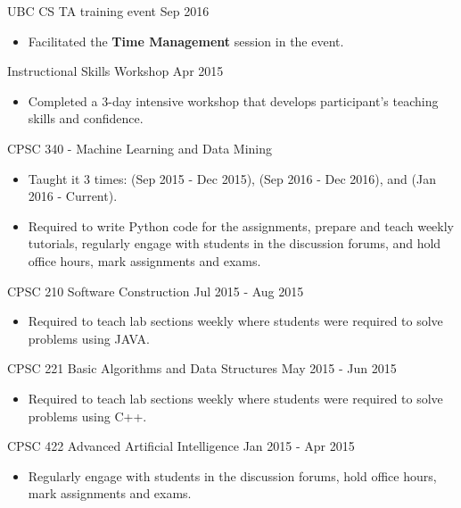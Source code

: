 \documentclass[10pt]{article}
\newenvironment{innerlist}[1][\enskip\textbullet]%
        {\begin{itemize}[#1,leftmargin=*,parsep=0pt,itemsep=0pt,topsep=0pt,partopsep=0pt]}
        {\end{itemize}}
\begin{document}
UBC CS TA training event \hfill Sep 2016
\begin{innerlist}
    \item Facilitated the {\bf Time Management} session in the event.\\
\end{innerlist}

Instructional Skills Workshop \hfill Apr 2015
\begin{innerlist}
    \item Completed a 3-day intensive workshop that develops participant's teaching skills and confidence.\\
\end{innerlist}


CPSC 340 - Machine Learning and Data Mining
\begin{innerlist}
    \item Taught it 3 times: (Sep 2015 - Dec 2015), (Sep 2016 - Dec 2016), and (Jan 2016 - Current).
    \item Required to write Python code for the assignments, prepare and teach weekly tutorials, regularly engage with students in the discussion forums, and hold office hours, mark assignments and exams.\\
\end{innerlist}

CPSC 210 Software Construction \hfill Jul 2015 - Aug 2015
\begin{innerlist}
    \item Required to teach lab sections weekly where students were required to solve problems using JAVA.\\
\end{innerlist}

CPSC 221 Basic Algorithms and Data Structures  \hfill May 2015 - Jun 2015
\begin{innerlist}
   \item Required to teach lab sections weekly where students were required to solve problems using C++.\\
\end{innerlist}

CPSC 422 Advanced Artificial Intelligence \hfill Jan 2015 - Apr 2015
\begin{innerlist}
    \item Regularly engage with students in the discussion forums, hold office hours, mark assignments and exams.\\
\end{innerlist}
\end{document}
